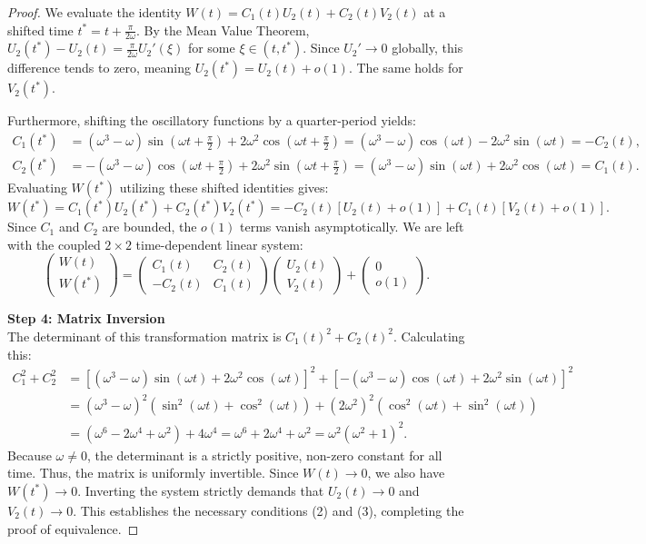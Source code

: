 \documentclass[10pt,reqno]{amsart}
\theoremstyle{definition}
\begin{document}
\begin{proof}
		We evaluate the identity $W(t) = C_1(t) U_2(t) + C_2(t) V_2(t)$ at a shifted time $t^* = t + \frac{\pi}{2\omega}$. 
		By the Mean Value Theorem, $U_2(t^*) - U_2(t) = \frac{\pi}{2\omega} U_2'(\xi)$ for some $\xi \in (t, t^*)$. Since $U_2' \to 0$ globally, this difference tends to zero, meaning $U_2(t^*) = U_2(t) + o(1)$. The same holds for $V_2(t^*)$. 
		
		Furthermore, shifting the oscillatory functions by a quarter-period yields:
		\begin{align*}
			C_1(t^*) &= (\omega^3-\omega)\sin\left(\omega t + \frac{\pi}{2}\right) + 2\omega^2\cos\left(\omega t + \frac{\pi}{2}\right) = (\omega^3-\omega)\cos(\omega t) - 2\omega^2\sin(\omega t) = -C_2(t), \\
			C_2(t^*) &= -(\omega^3-\omega)\cos\left(\omega t + \frac{\pi}{2}\right) + 2\omega^2\sin\left(\omega t + \frac{\pi}{2}\right) = (\omega^3-\omega)\sin(\omega t) + 2\omega^2\cos(\omega t) = C_1(t).
		\end{align*}
		Evaluating $W(t^*)$ utilizing these shifted identities gives:
		\[ W(t^*) = C_1(t^*)U_2(t^*) + C_2(t^*)V_2(t^*) = -C_2(t)[U_2(t) + o(1)] + C_1(t)[V_2(t) + o(1)]. \]
		Since $C_1$ and $C_2$ are bounded, the $o(1)$ terms vanish asymptotically. We are left with the coupled $2 \times 2$ time-dependent linear system:
		\[ \begin{pmatrix} W(t) \\ W(t^*) \end{pmatrix} = \begin{pmatrix} C_1(t) & C_2(t) \\ -C_2(t) & C_1(t) \end{pmatrix} \begin{pmatrix} U_2(t) \\ V_2(t) \end{pmatrix} + \begin{pmatrix} 0 \\ o(1) \end{pmatrix}. \]
		
		\textbf{Step 4: Matrix Inversion}\\
		The determinant of this transformation matrix is $C_1(t)^2 + C_2(t)^2$. Calculating this:
		\begin{align*}
			C_1^2 + C_2^2 &= \left[ (\omega^3-\omega)\sin(\omega t) + 2\omega^2\cos(\omega t) \right]^2 + \left[ -(\omega^3-\omega)\cos(\omega t) + 2\omega^2\sin(\omega t) \right]^2 \\
			&= (\omega^3-\omega)^2 (\sin^2(\omega t) + \cos^2(\omega t)) + (2\omega^2)^2 (\cos^2(\omega t) + \sin^2(\omega t)) \\
			&= (\omega^6 - 2\omega^4 + \omega^2) + 4\omega^4 = \omega^6 + 2\omega^4 + \omega^2 = \omega^2(\omega^2 + 1)^2.
		\end{align*}
		Because $\omega \neq 0$, the determinant is a strictly positive, non-zero constant for all time. Thus, the matrix is uniformly invertible. Since $W(t) \to 0$, we also have $W(t^*) \to 0$. Inverting the system strictly demands that $U_2(t) \to 0$ and $V_2(t) \to 0$. This establishes the necessary conditions (2) and (3), completing the proof of equivalence.
	\end{proof}
	
\end{document}
